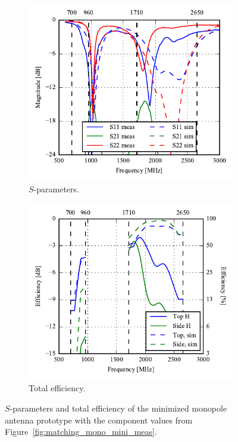 \begin{figure}[htbp]
    \centering
    \begin{subfigure}{0.49\linewidth}
        \includegraphics{img/tech_sol/monopole/5mm/sparams_comp.pdf}
        \caption{$S$-parameters.}
    \end{subfigure}
    \hfill
    \begin{subfigure}{0.49\linewidth}
        \includegraphics{img/tech_sol/monopole/5mm/eff_comp.pdf}
        \caption{Total efficiency.}
    \end{subfigure}
    \caption{$S$-parameters and total efficiency of the minimized monopole antenna prototype with the component values from Figure~\ref{fig:matching_mono_mini_meas}.}
    \label{fig:mono_proto_sparam_eff5}
\end{figure}

